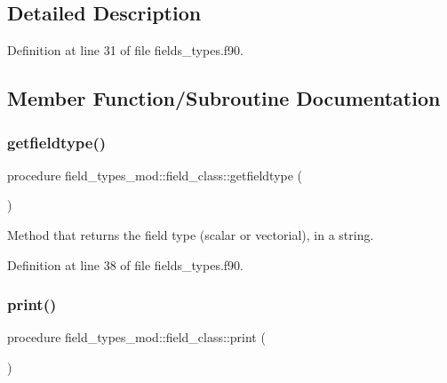 \subsection{Detailed Description}


Definition at line 31 of file fields\+\_\+types.\+f90.



\subsection{Member Function/\+Subroutine Documentation}
\mbox{\label{structfield__types__mod_1_1field__class_a849b182cbc2c6fca4840f2d2b4f4ee97}} 
\subsubsection{\texorpdfstring{getfieldtype()}{getfieldtype()}}
{\footnotesize\ttfamily procedure field\+\_\+types\+\_\+mod\+::field\+\_\+class\+::getfieldtype (\begin{DoxyParamCaption}{ }\end{DoxyParamCaption})\hspace{0.3cm}{\ttfamily [private]}}



Method that returns the field type (scalar or vectorial), in a string. 



Definition at line 38 of file fields\+\_\+types.\+f90.

\mbox{\label{structfield__types__mod_1_1field__class_a29971d16f545e2b43616ba928ac69c1b}} 
\subsubsection{\texorpdfstring{print()}{print()}}
{\footnotesize\ttfamily procedure field\+\_\+types\+\_\+mod\+::field\+\_\+class\+::print (\begin{DoxyParamCaption}{ }\end{DoxyParamCaption})\hspace{0.3cm}{\ttfamily [private]}}



